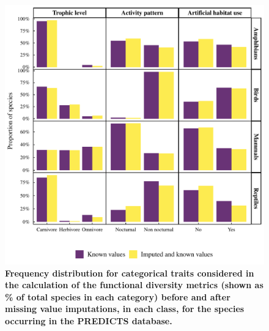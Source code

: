 \newpage
\begin{figure}[h!]
\centering
\includegraphics[scale=0.8]{Supporting/Chapter3/Figures/SI_dist_cat}
\caption[Frequency distribution for categorical traits considered in the calculation of the functional diversity metrics]{\textbf{Frequency distribution for categorical traits considered in the calculation of the functional diversity metrics (shown as \% of total species in each category) before and after missing value imputations, in each class, for the species occurring in the PREDICTS database.}}
\label{}
\end{figure}
\newpage

